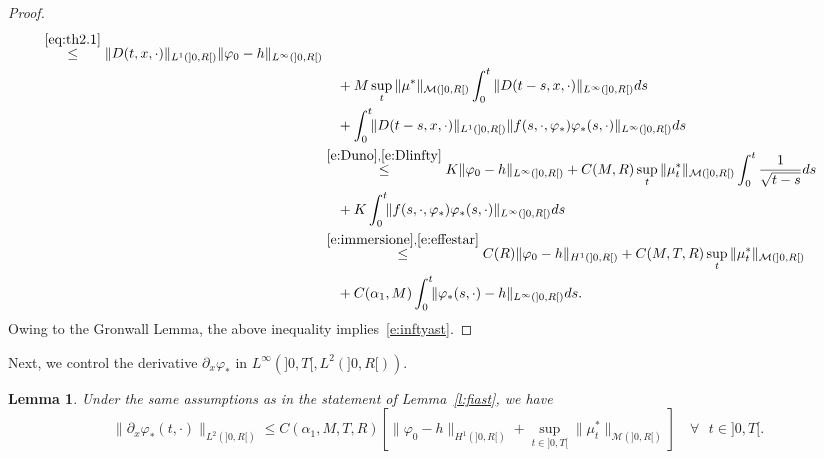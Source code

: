 \documentclass[11pt,leqno]{amsart}
\newtheorem{lemma}[theorem]{Lemma}
\numberwithin{equation}{section}
\begin{document}
\begin{proof}
\begin{equation*}
\begin{split}
    \stackrel{\eqref{eq:th2.1}}{\leq} \| D(t, x, \cdot)\|_{L^1 (]0,
      R[)} \| {\varphi}_0 -h \|_{L^\infty (]0, R[)}
    \\ 
    & \quad + M \sup_t
    \| \mu^\ast \|_{\mathcal M (]0, R[ )}
    \int_0^t \| D(t-s, x, \cdot) \|_{L^\infty (]0, R[)}ds 
    \\
    & \quad + \int_0^t \! \!  \| D(t-s, x, \cdot) \|_{L^1 (]0, R[)} \|
    f(s, \cdot, {\varphi}_\ast) {\varphi}_\ast (s, \cdot) \|_{L^\infty (]0, R[)}
    ds
    \\
    & \stackrel{\eqref{e:Duno},\eqref{e:Dlinfty}}{\leq} K \| {\varphi}_0 -h
    \|_{L^\infty (]0, R[)} + C(M, R) \sup_t \| \mu_t^\ast \|_{\mathcal M
      (]0, R[ )}
    \int_0^t \frac{1}{\sqrt{t-s}} ds 
    \\
    & \quad + K \int_0^t \! \!
    \| f(s, \cdot, {\varphi}_\ast) {\varphi}_\ast (s, \cdot) \|_{L^\infty (]0, R[)} ds
    \\
    & \stackrel{\eqref{e:immersione},\eqref{e:effestar}}{\leq} C(R) \|
    {\varphi}_0 -h \|_{H^1 (]0, R[)} +
    C(M, T, R) \sup_t \| \mu_t^\ast \|_{\mathcal M (]0, R[ )}  
    \\
    & \quad + C(\alpha_1, M) \int_0^t \! \!  \| {\varphi}_\ast(s, \cdot) -h
    \|_{L^\infty (]0, R[)} ds.
  \end{split}
\end{equation*}
Owing to the Gronwall Lemma, the above inequality 
implies~\eqref{e:inftyast}. 
\end{proof}
Next, we control the derivative ${\partial_x } {\varphi}_\ast$ in $L^\infty (]0, T[, L^2 (]0, R[))$.
\begin{lemma}
  \label{l:linftyelledue}
  Under the same assumptions as in the statement of Lemma~\ref{l:fiast},
  we have 
\begin{equation}
\label{e:linftyelledue}
    \| \partial_x {\varphi}_\ast (t, \cdot) \|_{L^2 (]0, R[)}
    \leq C(\alpha_1, M, T, R) 
    \left[ 
     \| {\varphi}_0 - h \|_{H^1 (]0, R[)}+
     \sup_{t \in ]0, T[} 
     \| \mu_t^\ast \|_{\mathcal M (]0, R[)}  \right] \quad 
     \forall \text{ $t \in ]0, T[$.}
\end{equation}
\end{lemma}
\end{document}
